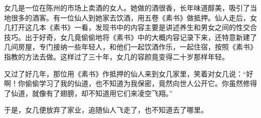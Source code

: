 \documentclass[a4paper,12pt,UTF8,twoside]{ctexbook}
\begin{document}
女几是一位在陈州的市场上卖酒的女人。她做的酒很香，长年味道醇美，吸引了当地很多的酒客。有一位仙人到她家去饮酒，用五卷《素书》做抵押。仙人走后，女几打开这几本《素书》一看，发现书中的内容主要是讲述养生和男女之间的性交合技巧。出于好奇，女几竟偷偷地将《素书》中的大概内容记录下来，还特意新建了几间房屋，专门接纳一些年轻人，和他们一起饮酒作乐，一起住宿，按照《素书》指教的方法去做。这样过了三十年，女几的容颜竟变得二十岁那样年轻。

又过了好几年，那位用《素书》作抵押的仙人来到女几家里，笑着对女几说：“好啊！你偷偷学习了我的仙道，也不知道为我保密，竟然向世人公开它。你虽然修得了仙道，就像有了翅膀，却不知道用它们来凌空飞翔。”

于是，女几便放弃了家业，追随仙人飞走了，也不知道去了哪里。

\backmatter
\end{document}
